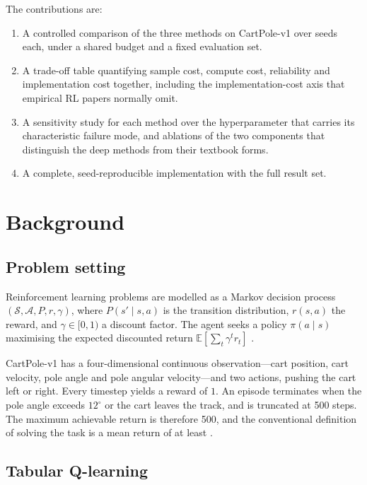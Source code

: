 \documentclass[conference]{IEEEtran}
\begin{document}
The contributions are:

\begin{enumerate}
\item A controlled comparison of the three methods on CartPole-v1 over
      \NumSeeds{} seeds each, under a shared budget and a fixed evaluation set.
\item A trade-off table quantifying sample cost, compute cost, reliability and
      implementation cost together, including the implementation-cost axis that
      empirical RL papers normally omit.
\item A sensitivity study for each method over the hyperparameter that carries
      its characteristic failure mode, and ablations of the two components that
      distinguish the deep methods from their textbook forms.
\item A complete, seed-reproducible implementation with the full result set.
\end{enumerate}

\section{Background}

\subsection{Problem setting}

Reinforcement learning problems are modelled as a Markov decision process
$(\mathcal{S}, \mathcal{A}, P, r, \gamma)$, where $P(s' \mid s, a)$ is the
transition distribution, $r(s,a)$ the reward, and $\gamma \in [0,1)$ a discount
factor. The agent seeks a policy $\pi(a \mid s)$ maximising the expected
discounted return $\mathbb{E}\!\left[\sum_{t} \gamma^{t} r_t\right]$
\cite{sutton2018}.

CartPole-v1 has a four-dimensional continuous observation---cart position, cart
velocity, pole angle and pole angular velocity---and two actions, pushing the
cart left or right. Every timestep yields a reward of $1$. An episode terminates
when the pole angle exceeds $12^{\circ}$ or the cart leaves the track, and is
truncated at 500 steps. The maximum achievable return is therefore 500, and the
conventional definition of solving the task is a mean return of at least
\SolvedThreshold{}.

\subsection{Tabular Q-learning}
\end{document}
